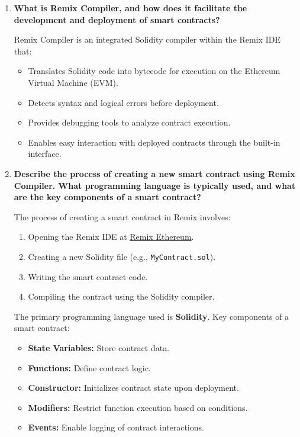 \documentclass[11pt]{article}
\begin{document}
\begin{enumerate}
    \item \textbf{What is Remix Compiler, and how does it facilitate the development and deployment of smart contracts?}
    
    Remix Compiler is an integrated Solidity compiler within the Remix IDE that:
    \begin{itemize}
        \item Translates Solidity code into bytecode for execution on the Ethereum Virtual Machine (EVM).
        \item Detects syntax and logical errors before deployment.
        \item Provides debugging tools to analyze contract execution.
        \item Enables easy interaction with deployed contracts through the built-in interface.
    \end{itemize}

    \item \textbf{Describe the process of creating a new smart contract using Remix Compiler. What programming language is typically used, and what are the key components of a smart contract?}
    
    The process of creating a smart contract in Remix involves:
    \begin{enumerate}
        \item Opening the Remix IDE at \href{https://remix.ethereum.org}{Remix Ethereum}.
        \item Creating a new Solidity file (e.g., \texttt{MyContract.sol}).
        \item Writing the smart contract code.
        \item Compiling the contract using the Solidity compiler.
    \end{enumerate}
    
    The primary programming language used is \textbf{Solidity}.  
    Key components of a smart contract:
    \begin{itemize}
        \item \textbf{State Variables:} Store contract data.
        \item \textbf{Functions:} Define contract logic.
        \item \textbf{Constructor:} Initializes contract state upon deployment.
        \item \textbf{Modifiers:} Restrict function execution based on conditions.
        \item \textbf{Events:} Enable logging of contract interactions.
    \end{itemize}


\end{enumerate}
\end{document}
